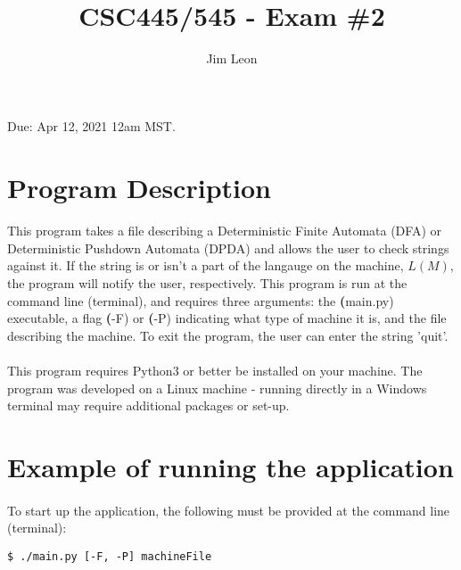 \documentclass[12pt]{article}
\title{CSC445/545 - Exam \#2}
\author{Jim Leon}
\begin{document}
\maketitle
Due:  Apr 12, 2021 12am MST.


\section{Program Description}
\paragraph{}
This program takes a file describing a Deterministic Finite Automata (DFA) or Deterministic 
Pushdown Automata (DPDA) and allows the user to check strings against it.  If the string is or 
isn't a part of the langauge on the machine, $L(M)$, the program will notify the user, 
respectively.  This program is run at the command line (terminal), and requires three arguments:  
the \textbf(main.py) executable, a flag \textbf(-F) or \textbf(-P) indicating what type of machine it is, 
and the file describing the machine.  To exit the program, the user can enter the string 'quit'.

\paragraph{}
This program requires Python3 or better be installed on your machine.  The program was developed 
on a Linux machine - running directly in a Windows terminal may require additional packages 
or set-up.

\section{Example of running the application}
\paragraph{}
To start up the application, the following must be provided at the command line (terminal):

\begin{verbatim}
$ ./main.py [-F, -P] machineFile
\end{verbatim}
\end{document}
